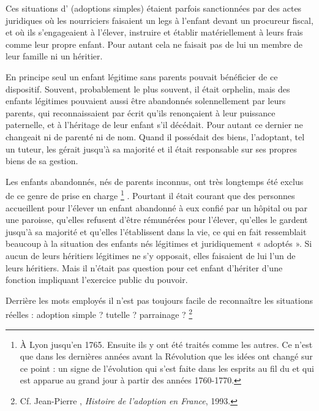  Ces situations d' (adoptions simples) étaient parfois sanctionnées par des actes juridiques où les nourriciers faisaient un legs à l'enfant devant un procureur fiscal, et où ils s'engageaient à l'élever, instruire et établir matériellement à leurs frais comme leur propre enfant. Pour autant cela ne faisait pas de lui un membre de leur famille ni un héritier. 

 En principe seul un enfant légitime sans parents pouvait bénéficier de ce dispositif. Souvent, probablement le plus souvent, il était orphelin, mais des enfants légitimes pouvaient aussi être abandonnés solennellement par leurs parents, qui reconnaissaient par écrit qu'ils renonçaient à leur puissance paternelle, et à l'héritage de leur enfant s'il décédait. Pour autant ce dernier ne changeait ni de parenté ni de nom. Quand il possédait des biens, l'adoptant, tel un tuteur, les gérait jusqu'à sa majorité et il était responsable sur ses propres biens de sa gestion. 

 Les enfants abandonnés, nés de parents inconnus, ont très longtemps été exclus de ce genre de prise en charge%
\footnote{À Lyon jusqu'en 1765. Ensuite ils y ont été traités comme les autres. Ce n'est que dans les dernières années avant la Révolution que les idées ont changé sur ce point : un signe de l'évolution qui s'est faite dans les esprits au fil du  et qui est apparue au grand jour à partir des années 1760-1770.}%
. Pourtant il était courant que des personnes accueillent pour l'élever un enfant abandonné à eux confié par un hôpital ou par une paroisse, qu'elles refusent d'être rémunérées pour l'élever, qu'elles le gardent jusqu'à sa majorité et qu'elles l'établissent dans la vie, ce qui en fait ressemblait beaucoup à la situation des enfants nés légitimes et juridiquement « adoptés ». Si aucun de leurs héritiers légitimes ne s'y opposait, elles faisaient de lui l'un de leurs héritiers. Mais il n'était pas question pour cet enfant d'hériter d'une fonction impliquant l'exercice public du pouvoir. 

 Derrière les mots employés il n'est pas toujours facile de reconnaître les situations réelles : adoption simple ? tutelle ? parrainage ?%
\footnote{Cf. Jean-Pierre , \emph{Histoire de l'adoption en France}, 1993.} 


